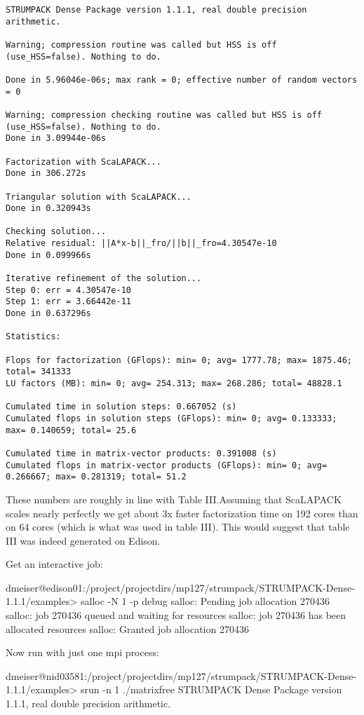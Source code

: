 \documentclass{acmsmall}
\begin{document}
\begin{verbatim}
STRUMPACK Dense Package version 1.1.1, real double precision arithmetic.

Warning; compression routine was called but HSS is off (use_HSS=false). Nothing to do.

Done in 5.96046e-06s; max rank = 0; effective number of random vectors = 0

Warning; compression checking routine was called but HSS is off (use_HSS=false). Nothing to do.
Done in 3.09944e-06s

Factorization with ScaLAPACK...
Done in 306.272s

Triangular solution with ScaLAPACK...
Done in 0.320943s

Checking solution...
Relative residual: ||A*x-b||_fro/||b||_fro=4.30547e-10
Done in 0.099966s

Iterative refinement of the solution...
Step 0: err = 4.30547e-10
Step 1: err = 3.66442e-11
Done in 0.637296s

Statistics: 

Flops for factorization (GFlops): min= 0; avg= 1777.78; max= 1875.46; total= 341333
LU factors (MB): min= 0; avg= 254.313; max= 268.286; total= 48828.1

Cumulated time in solution steps: 0.667052 (s)
Cumulated flops in solution steps (GFlops): min= 0; avg= 0.133333; max= 0.140659; total= 25.6

Cumulated time in matrix-vector products: 0.391008 (s)
Cumulated flops in matrix-vector products (GFlops): min= 0; avg= 0.266667; max= 0.281319; total= 51.2
\end{verbatim}

These numbers are roughly in line with Table III.\@  Assuming that
ScaLAPACK scales nearly perfectly we get about 3x faster
factorization time on 192 cores than on 64 cores (which is what
was used in table III).  This would suggest that table III was
indeed generated on Edison.


Get an interactive job:


dmeiser@edison01:/project/projectdirs/mp127/strumpack/STRUMPACK-Dense-1.1.1/examples>
salloc -N 1 -p debug
salloc: Pending job allocation 270436
salloc: job 270436 queued and waiting for resources
salloc: job 270436 has been allocated resources
salloc: Granted job allocation 270436


Now run with just one mpi process:


dmeiser@nid03581:/project/projectdirs/mp127/strumpack/STRUMPACK-Dense-1.1.1/examples>
srun -n 1 ./matrixfree
STRUMPACK Dense Package version 1.1.1, real double precision arithmetic.
\end{document}
